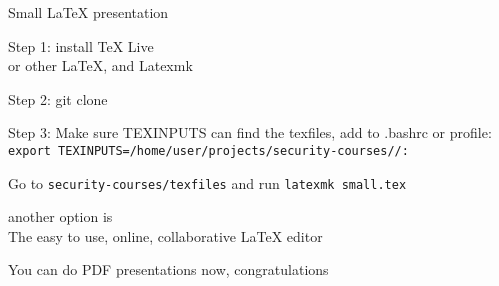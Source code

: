 \documentclass[Screen16to9,17pt]{foils}
\begin{document}
{}

\mytitlepage
{Small LaTeX presentation}

\LogoOn


\begin{list1}
\item Step 1: install TeX Live \\
 or other LaTeX, and Latexmk 
\item Step 2: git clone 
\item Step 3: Make sure TEXINPUTS can find the texfiles, add to .bashrc or profile:\\
\verb+export TEXINPUTS=/home/user/projects/security-courses//:+
\item Go to \verb+security-courses/texfiles+ and run \verb+latexmk small.tex+
\item another option is \\ The easy to use, online, collaborative LaTeX editor
\end{list1}

\vskip 1cm
\centerline{\LARGE You can do PDF presentations now, congratulations}
\end{document}
